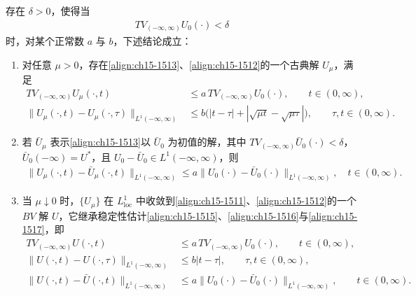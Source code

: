 \documentclass[../../main.tex]{subfiles}
\begin{document}
\begin{theorem}[消失黏性主定理]\label{theorem:ch15-消失黏性主定理}
存在 $\delta>0$，使得当
\begin{align}
TV_{(-\infty,\infty)}U_0(\cdot)<\delta
\label{align:ch15-1514}
\end{align}
时，对某个正常数 $a$ 与 $b$，下述结论成立：
\begin{enumerate}
\item\label{item:ch15-151-a} 对任意 $\mu>0$，存在\eqref{align:ch15-1513}、\eqref{align:ch15-1512}的一个古典解 $U_\mu$，满足
\begin{align}
TV_{(-\infty,\infty)}U_\mu(\cdot,t)&\leqslant a\,TV_{(-\infty,\infty)}U_0(\cdot),\qquad t\in(0,\infty),
\label{align:ch15-1515}\\
\|U_\mu(\cdot,t)-U_\mu(\cdot,\tau)\|_{L^1(-\infty,\infty)}&\leqslant b\bigl(|t-\tau|+|\sqrt{\mu t}-\sqrt{\mu\tau}|\bigr),\qquad \tau,t\in(0,\infty).
\label{align:ch15-1516}
\end{align}
\item\label{item:ch15-151-b} 若 $\bar U_\mu$ 表示\eqref{align:ch15-1513}以 $\bar U_0$ 为初值的解，其中 $TV_{(-\infty,\infty)}\bar U_0(\cdot)<\delta$，$\bar U_0(-\infty)=U^*$，且 $U_0-\bar U_0\in L^1(-\infty,\infty)$，则
\begin{align}
\|U_\mu(\cdot,t)-\bar U_\mu(\cdot,t)\|_{L^1(-\infty,\infty)}\leqslant a\|U_0(\cdot)-\bar U_0(\cdot)\|_{L^1(-\infty,\infty)},\quad t\in(0,\infty).
\label{align:ch15-1517}
\end{align}
\item\label{item:ch15-151-c} 当 $\mu\downarrow0$ 时，$\{U_\mu\}$ 在 $L^1_{\mathrm{loc}}$ 中收敛到\eqref{align:ch15-1511}、\eqref{align:ch15-1512}的一个 $BV$ 解 $U$，它继承稳定性估计\eqref{align:ch15-1515}、\eqref{align:ch15-1516}与\eqref{align:ch15-1517}，即
\begin{align}
TV_{(-\infty,\infty)}U(\cdot,t)&\leqslant a\,TV_{(-\infty,\infty)}U_0(\cdot),\qquad t\in(0,\infty),
\label{align:ch15-1518}\\
\|U(\cdot,t)-U(\cdot,\tau)\|_{L^1(-\infty,\infty)}&\leqslant b|t-\tau|,\qquad \tau,t\in(0,\infty),
\label{align:ch15-1519}\\
\|U(\cdot,t)-\bar U(\cdot,t)\|_{L^1(-\infty,\infty)}&\leqslant a\|U_0(\cdot)-\bar U_0(\cdot)\|_{L^1(-\infty,\infty)},\qquad t\in(0,\infty).
\label{align:ch15-15110}
\end{align}
\end{enumerate}
\end{theorem}
\end{document}
